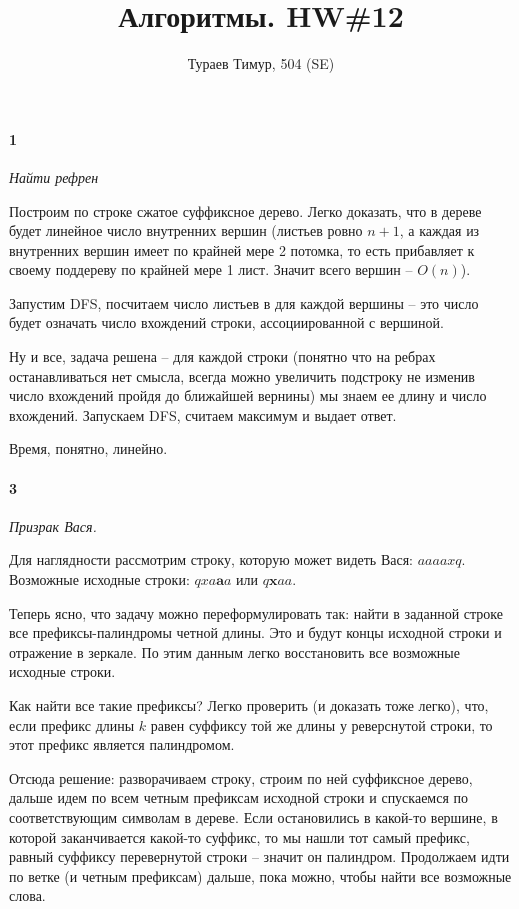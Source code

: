 \documentclass[russian]{article}
\begin{document}
\title{Алгоритмы. HW\#12}
\author{Тураев Тимур, 504 (SE)}
\maketitle

\paragraph*{1}

\textit{Найти рефрен}

Построим по строке сжатое суффиксное дерево. Легко доказать, что в дереве будет линейное число внутренних вершин (листьев ровно $n+1$, а каждая из внутренних вершин имеет по крайней мере 2 потомка, то есть прибавляет к своему поддереву по крайней мере 1 лист. Значит всего вершин -- $O(n)$).

Запустим DFS, посчитаем число листьев в для каждой вершины -- это число будет означать число вхождений строки, ассоциированной с вершиной. 

Ну и все, задача решена -- для каждой строки (понятно что на ребрах останавливаться нет смысла, всегда можно увеличить подстроку не изменив число вхождений пройдя до ближайшей вернины) мы знаем ее длину и число вхождений. Запускаем DFS, считаем максимум и выдает ответ.

Время, понятно, линейно.

\paragraph*{3}

\textit{Призрак Вася.}

Для наглядности рассмотрим строку, которую может видеть Вася: $aaaaxq$. Возможные исходные строки: $qxa\textbf{a}a$ или $q\textbf{x}aa$.

Теперь ясно, что задачу можно переформулировать так: найти в заданной строке все префиксы-палиндромы четной длины. Это и будут концы исходной строки и отражение в зеркале. По этим данным легко восстановить все возможные исходные строки.

Как найти все такие префиксы? Легко проверить (и доказать тоже легко), что, если префикс длины $k$ равен суффиксу той же длины у реверснутой строки, то этот префикс является палиндромом. 

Отсюда решение: разворачиваем строку, строим по ней суффиксное дерево, дальше идем по всем четным префиксам исходной строки и спускаемся по соответствующим символам в дереве. Если остановились в какой-то вершине, в которой заканчивается какой-то суффикс, то мы нашли тот самый префикс, равный суффиксу перевернутой строки -- значит он палиндром. Продолжаем идти по ветке (и четным префиксам) дальше, пока можно, чтобы найти все возможные слова.
\end{document}
